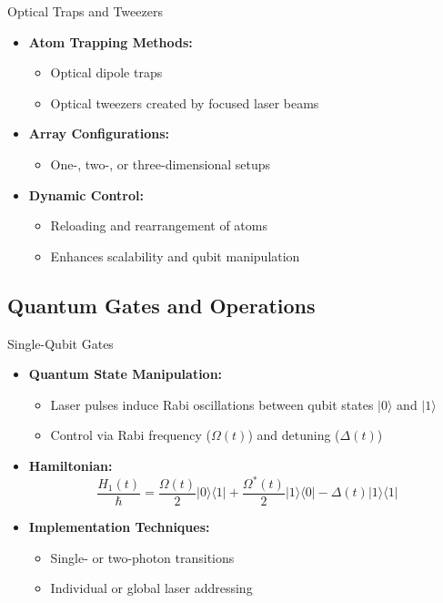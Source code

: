 \begin{frame}{Optical Traps and Tweezers}
  \begin{itemize}
    \item \textbf{Atom Trapping Methods:}
      \begin{itemize}
        \item Optical dipole traps
        \item Optical tweezers created by focused laser beams
      \end{itemize}
    \item \textbf{Array Configurations:}
      \begin{itemize}
        \item One-, two-, or three-dimensional setups
      \end{itemize}
    \item \textbf{Dynamic Control:}
      \begin{itemize}
        \item Reloading and rearrangement of atoms
        \item Enhances scalability and qubit manipulation
      \end{itemize}
  \end{itemize}
\end{frame}

\subsection{Quantum Gates and Operations}

\begin{frame}{Single-Qubit Gates}
  \begin{itemize}
    \item \textbf{Quantum State Manipulation:}
      \begin{itemize}
        \item Laser pulses induce Rabi oscillations between qubit states \( |0\rangle \) and \( |1\rangle \)
        \item Control via Rabi frequency (\( \Omega(t) \)) and detuning (\( \Delta(t) \))
      \end{itemize}
    \item \textbf{Hamiltonian:}
      \[
          \frac{H_1(t)}{\hbar} = \frac{\Omega(t)}{2} |0\rangle\langle 1| + \frac{\Omega^*(t)}{2} |1\rangle\langle 0| - \Delta(t) |1\rangle\langle 1|
      \]
    \item \textbf{Implementation Techniques:}
      \begin{itemize}
        \item Single- or two-photon transitions
        \item Individual or global laser addressing
      \end{itemize}
  \end{itemize}
\end{frame}

